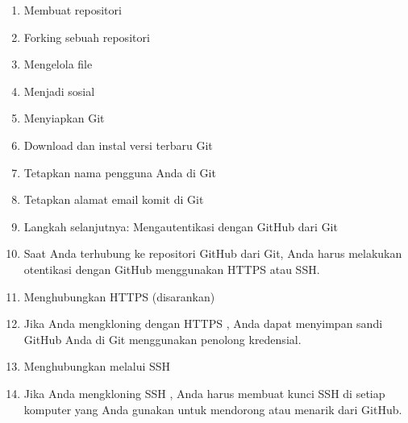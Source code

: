 \begin{enumerate}
	\item Membuat repositori
	\item Forking sebuah repositori
	\item Mengelola file
	\item Menjadi sosial
	\item Menyiapkan Git
	\item Download dan instal versi terbaru Git
	\item Tetapkan nama pengguna Anda di Git
	\item Tetapkan alamat email komit di Git
	\item Langkah selanjutnya: Mengautentikasi dengan GitHub dari Git
	\item Saat Anda terhubung ke repositori GitHub dari Git, Anda harus melakukan otentikasi dengan GitHub menggunakan HTTPS atau SSH.
	\item Menghubungkan HTTPS (disarankan)
	\item Jika Anda $  $mengkloning dengan HTTPS $  $, Anda dapat $  $menyimpan sandi GitHub Anda di Git menggunakan penolong kredensial.
	\item Menghubungkan melalui SSH
	\item Jika Anda $  $mengkloning SSH $  $, Anda harus $  $membuat kunci SSH $  $di setiap komputer yang Anda gunakan untuk mendorong atau menarik dari GitHub.
\end{enumerate}


